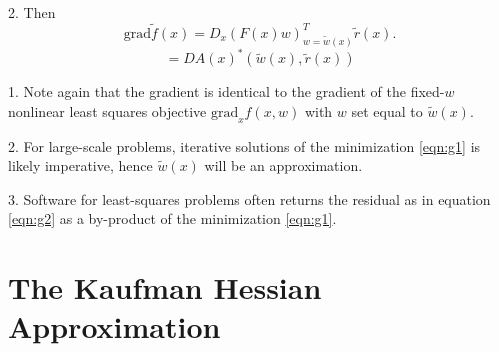 2.  Then
$$
\mbox{grad} \tilde{f}(x) = D_x(F(x)w)^T_{w=\tilde{w}(x)} \tilde{r}(x).
$$
\begin{equation}
  \label{eqn:g3}
= DA(x)^*(\tilde{w}(x),\tilde{r}(x))
\end{equation}

1. Note again that the gradient is identical to the gradient of the fixed-$w$ nonlinear least squares objective $\mbox{grad}_{x} f(x,w)$ with $w$ set equal to $\tilde{w}(x)$.

2. For large-scale problems, iterative solutions of the minimization \ref{eqn:g1} is likely imperative, hence $\tilde{w}(x)$ will be an approximation.

3. Software for least-squares problems often returns the residual as in equation \ref{eqn:g2} as a by-product of the minimization \ref{eqn:g1}.

\section{The Kaufman Hessian Approximation}

